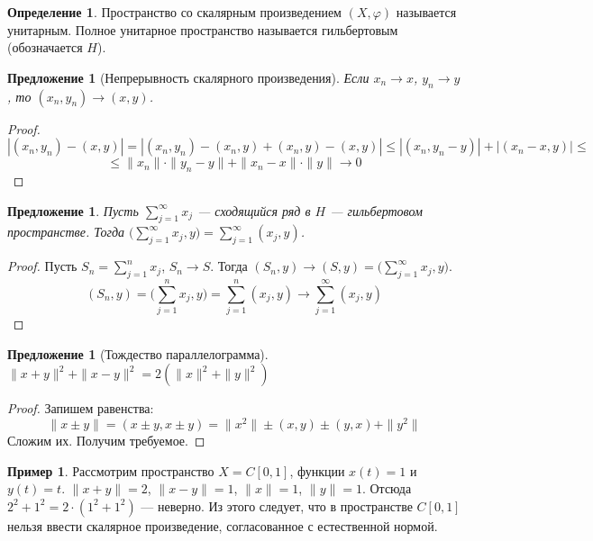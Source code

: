 \documentclass[11pt,openany,a4paper]{scrartcl}
\theoremstyle{plain}
\newtheorem{proposition}[theorem]{Предложение}
\theoremstyle{definition}
\newtheorem{definition}[theorem]{Определение}
\newtheorem{example}[theorem]{Пример}
\begin{document}
\begin{definition}
    Пространство со скалярным произведением $(X, \varphi)$ называется унитарным.
    Полное унитарное пространство называется гильбертовым (обозначается $H$).
\end{definition}

\begin{proposition}[Непрерывность скалярного произведения]
    Если  $x_n \to x$, $y_n \to y$, то $(x_n, y_n) \to (x, y)$.
\end{proposition}
\begin{proof}
    $$
    |(x_n, y_n) - (x, y)| = |(x_n, y_n) - (x_n, y) + (x_n, y) - (x, y)| \leqslant
    |(x_n, y_n - y)| + |(x_n - x, y)| \leqslant
    $$
    $$
    \leqslant \|x_n\| \cdot \|y_n - y\| + \|x_n - x\|\cdot \|y\| \to 0
    $$
\end{proof}

\begin{proposition}
    Пусть $\sum\limits_{j=1}^\infty x_j$ — сходящийся ряд в $H$ — гильбертовом
    пространстве. Тогда $\bigg(\sum\limits_{j=1}^\infty x_j, y\bigg) =
    \sum\limits_{j=1}^\infty (x_j, y)$.
\end{proposition}
\begin{proof}
    Пусть $S_n = \sum\limits_{j=1}^n x_j$, $S_n \to S$. Тогда
    $(S_n, y) \to (S, y) = \bigg(\sum\limits_{j=1}^\infty x_j, y\bigg)$.
    $$
    (S_n, y) = \bigg(\sum\limits_{j=1}^n x_j, y\bigg) =
    \sum\limits_{j=1}^n(x_j, y) \to
    \sum\limits_{j=1}^\infty(x_j, y)
    $$
\end{proof}

\begin{proposition}[Тождество параллелограмма]
    $\|x + y\|^2 + \|x - y\|^2 = 2(\|x\|^2 + \|y\|^2)$
\end{proposition}
\begin{proof}
    Запишем равенства:
    $$
    \|x \pm y\| = (x \pm y, x \pm y) = \|x^2\| \pm (x, y) \pm (y, x) + \|y^2\|
    $$
    Сложим их. Получим требуемое.
\end{proof}

\begin{example}
    Рассмотрим пространство $X = C[0, 1]$, функции $x(t) = 1$ и $y(t) = t$.
    $\|x + y\| = 2$, $\|x - y\| = 1$, $\|x\| = 1$, $\|y\| = 1$. Отсюда
    $2^2 + 1^2 = 2\cdot (1^2 + 1^2)$ — неверно. Из этого следует, что в 
    пространстве $C[0, 1]$ нельзя ввести скалярное произведение, согласованное
    с естественной нормой.
\end{example}
\end{document}
